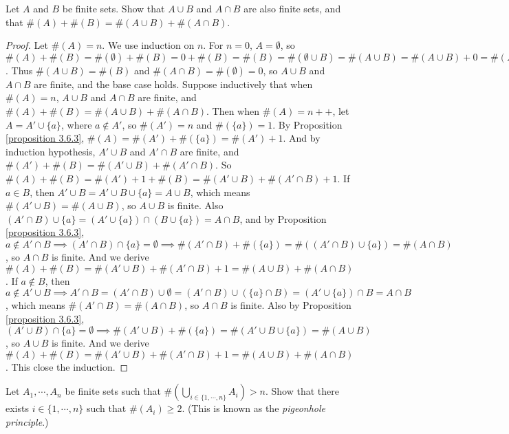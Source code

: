 \begin{exercise}\label{exercise 3.6.7}
Let \(A\) and \(B\) be finite sets.
Show that \(A \cup B\) and \(A \cap B\) are also finite sets, and that \(\#(A) + \#(B) = \#(A \cup B) + \#(A \cap B)\).
\end{exercise}

\begin{proof}
Let \(\#(A) = n\).
We use induction on \(n\).
For \(n = 0\), \(A = \emptyset\), so \(\#(A) + \#(B) = \#(\emptyset) + \#(B) = 0 + \#(B) = \#(B) = \#(\emptyset \cup B) = \#(A \cup B) = \#(A \cup B) + 0 = \#(A \cup B) + \#(\emptyset) = \#(A \cup B) + \#(\emptyset \cap B) = \#(A \cup B) + \#(A \cap B)\).
Thus \(\#(A \cup B) = \#(B)\) and \(\#(A \cap B) = \#(\emptyset) = 0\), so \(A \cup B\) and \(A \cap B\) are finite, and the base case holds.
Suppose inductively that when \(\#(A) = n\), \(A \cup B\) and \(A \cap B\) are finite, and \(\#(A) + \#(B) = \#(A \cup B) + \#(A \cap B)\).
Then when \(\#(A) = n++\), let \(A = A' \cup \{a\}\), where \(a \notin A'\), so \(\#(A') = n\) and \(\#(\{a\}) = 1\).
By Proposition \ref{proposition 3.6.3}, \(\#(A) = \#(A') + \#(\{a\}) = \#(A') + 1\).
And by induction hypothesis, \(A' \cup B\) and \(A' \cap B\) are finite, and \(\#(A') + \#(B) = \#(A' \cup B) + \#(A' \cap B)\).
So \(\#(A) + \#(B) = \#(A') + 1 + \#(B) = \#(A' \cup B) + \#(A' \cap B) + 1\).
If \(a \in B\), then \(A' \cup B = A' \cup B \cup \{a\} = A \cup B\), which means \(\#(A' \cup B) = \#(A \cup B)\), so \(A \cup B\) is finite.
Also \((A' \cap B) \cup \{a\} = (A' \cup \{a\}) \cap (B \cup \{a\}) = A \cap B\), and by Proposition \ref{proposition 3.6.3}, \(a \notin A' \cap B \implies (A' \cap B) \cap \{a\} = \emptyset \implies \#(A' \cap B) + \#(\{a\}) = \#((A' \cap B) \cup \{a\}) = \#(A \cap B)\), so \(A \cap B\) is finite.
And we derive \(\#(A) + \#(B) = \#(A' \cup B) + \#(A' \cap B) + 1 = \#(A \cup B) + \#(A \cap B)\).
If \(a \notin B\), then \(a \notin A' \cup B \implies A' \cap B = (A' \cap B) \cup \emptyset = (A' \cap B) \cup (\{a\} \cap B) = (A' \cup \{a\}) \cap B = A \cap B\), which means \(\#(A' \cap B) = \#(A \cap B)\), so \(A \cap B\) is finite.
Also by Proposition \ref{proposition 3.6.3}, \((A' \cup B) \cap \{a\} = \emptyset \implies \#(A' \cup B) + \#(\{a\}) = \#(A' \cup B \cup \{a\}) = \#(A \cup B)\), so \(A \cup B\) is finite.
And we derive \(\#(A) + \#(B) = \#(A' \cup B) + \#(A' \cap B) + 1 = \#(A \cup B) + \#(A \cap B)\).
This close the induction.
\end{proof}

\begin{exercise}\label{exercise 3.6.8}
Let \(A_1, \cdots, A_n\) be finite sets such that \(\#(\bigcup_{i \in \{1, \cdots, n\}} A_i) > n\).
Show that there exists \(i \in \{1, \cdots, n\}\) such that \(\#(A_i) \geq 2\).
(This is known as the \emph{pigeonhole principle}.)
\end{exercise}

